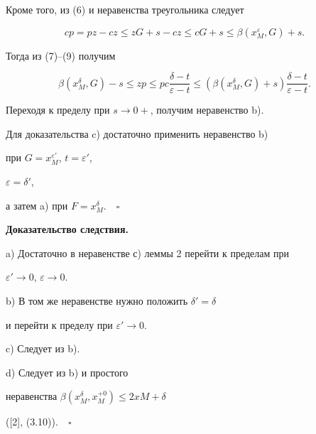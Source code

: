 Кроме того, из (6) и неравенства треугольника следует


\begin{equation}


cp = pz - cz \leq zG + s - cz \leq cG + s 


\leq \beta (x_{M}^{\varepsilon },G) + s.


\end{equation}


Тогда из (7)--(9) получим


$$


\beta (x_{M}^{\delta },G) -s \leq zp \leq


pc\frac{\delta - t }{\varepsilon - t}


\leq (\beta (x_{M}^{\delta },G) + s)\frac{\delta - t }{\varepsilon - t}.


$$


Переходя к пределу при $s \to 0+$, получим неравенство b).


 


Для доказательства c) достаточно применить неравенство b)


при $G = x_{M}^{\varepsilon '}$, $t = \varepsilon '$,


$\varepsilon = \delta '$,


а затем a) при $F = x_{M}^{\delta }$$.\quad\square$


\medskip





{\bf Доказательство следствия.}


a) Достаточно в неравенстве с) леммы 2 перейти к пределам при


$\varepsilon' \to 0$, $\varepsilon \to 0$. 





b) В том же неравенстве нужно положить $\delta ' = \delta$


и перейти к пределу при $\varepsilon ' \to 0$.


 


c) Следует из b).





d) Следует из b) и простого 


неравенства $\beta (x_{M}^{\delta },x_{M}^{+ 0}) \leq 2xM + \delta$ 


([2], (3.10))$.\quad\square$


\medskip





